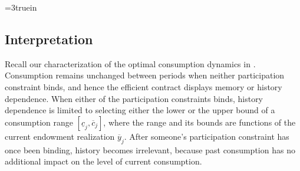 



\centerline{\epsfxsize=3truein}
\caption{The kink in $P(v)$ at the stationary value of $v$ for the two-state symmetric
example.}
\endfigure


\subsection{Interpretation}
Recall our characterization of the optimal consumption dynamics in
. Consumption remains unchanged between periods when
neither participation constraint binds, and hence the efficient
contract displays memory or history dependence. When either of the
participation constraints binds, history dependence is limited to
 selecting either the lower or the upper bound of a
consumption range $[\underline c_j, \overline c_j]$, where the
range and its bounds are functions of the current endowment
realization $\overline y_j$. After someone's participation
constraint has once been binding, history becomes irrelevant,
because past consumption has no additional impact on the level of
current consumption. %


